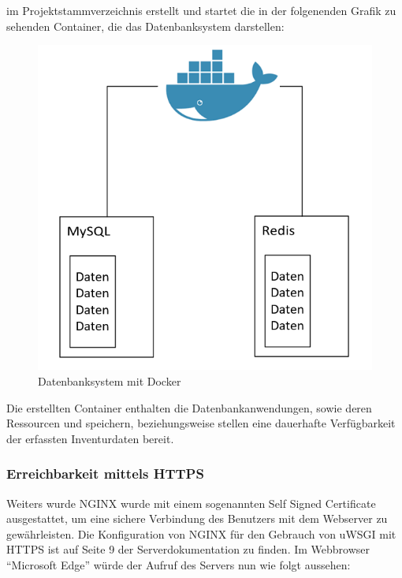 im Projektstammverzeichnis erstellt und startet die in der folgenenden
Grafik zu sehenden Container, die das Datenbanksystem darstellen:

\begin{figure}[ht]
\centering
\includegraphics{docker.png}
\caption{Datenbanksystem mit Docker}
\end{figure}

Die erstellten Container enthalten die Datenbankanwendungen, sowie deren
Ressourcen und speichern, beziehungsweise stellen eine dauerhafte
Verfügbarkeit der erfassten Inventurdaten bereit.

\hypertarget{erreichbarkeit-mittels-https}{%
\subsubsection{Erreichbarkeit mittels
HTTPS}\label{erreichbarkeit-mittels-https}}

Weiters wurde NGINX wurde mit einem sogenannten Self Signed Certificate
ausgestattet, um eine sichere Verbindung des Benutzers mit dem Webserver
zu gewährleisten. Die Konfiguration von NGINX für den Gebrauch von uWSGI
mit HTTPS ist auf Seite 9 der Serverdokumentation zu finden. Im
Webbrowser ``Microsoft Edge'' würde der Aufruf des Servers nun wie folgt
aussehen:

